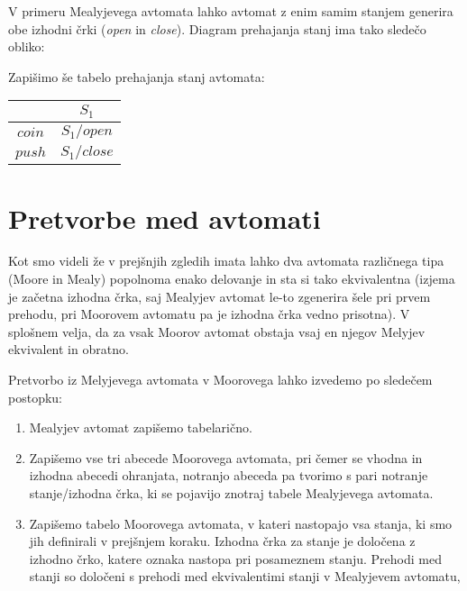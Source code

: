 \begin{resitev}
V primeru Mealyjevega avtomata lahko avtomat z enim samim stanjem generira obe izhodni črki (\emph{open} in \emph{close}). Diagram prehajanja stanj ima tako sledečo obliko:

\begin{center}
\end{center}

Zapišimo še tabelo prehajanja stanj avtomata:

\begin{center}
\begin{tabular}{c|c}
& $S_1$ \\
\hline
$coin$ & $S_1/open$ \\
$push$ & $S_1/close$
\end{tabular}
\end{center}

\end{resitev}



\section{Pretvorbe med avtomati}

Kot smo videli že v prejšnjih zgledih imata lahko dva avtomata različnega tipa (Moore in Mealy) popolnoma enako delovanje in sta si tako ekvivalentna (izjema je začetna izhodna črka, saj Mealyjev avtomat le-to zgenerira šele pri prvem prehodu, pri Moorovem avtomatu pa je izhodna črka vedno prisotna). V splošnem velja, da za vsak Moorov avtomat obstaja vsaj en njegov Melyjev ekvivalent in obratno. 

Pretvorbo iz Melyjevega avtomata v Moorovega lahko izvedemo po sledečem postopku:
\begin{enumerate}
\item Mealyjev avtomat zapišemo tabelarično.
\item Zapišemo vse tri abecede Moorovega avtomata, pri čemer se vhodna in izhodna abecedi ohranjata, notranjo abeceda pa tvorimo s pari notranje stanje/izhodna črka, ki se pojavijo znotraj tabele Mealyjevega avtomata.
\item Zapišemo tabelo Moorovega avtomata, v kateri nastopajo vsa stanja, ki smo jih definirali v prejšnjem koraku. Izhodna črka za stanje je določena z izhodno črko, katere oznaka nastopa pri posameznem stanju. Prehodi med stanji so določeni s prehodi med ekvivalentimi stanji v Mealyjevem avtomatu,
\end{enumerate}

